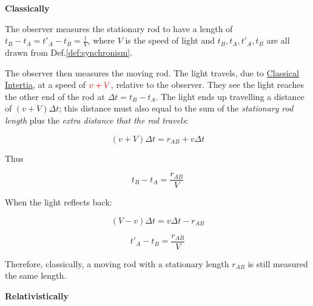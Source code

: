 \begin{tcolorbox}[
    breakable,
    parbox=false,
    skin=bicolor,
    sidebyside,
    boxrule=0pt,
    frame style={
        top color=blue!50!white
    },
    colback=red!5!white,
    colbacklower=green!5!white,
    title={Suppose the rod is moving in the x-direction at a constant speed $v$. Let the length of the moving rod, measured in the system at rest, be denoted as $r_{AB}$, where $A$ and $B$ are the two ends of the rod.}
]
    \begin{center}
        \textbf{Classically}
    \end{center}

    The observer measures the stationary rod to have a length of $t_B - t_A = t'_A - t_B = \frac{l}{V}$, where $V$ is
    the speed of light and $t_B, t_A, t'_A, t_B$ are all drawn from Def.\ref{def:synchronism}.

    The observer then measures the moving rod. The light travels, due to
    \href{https://en.wikipedia.org/wiki/Inertia}{Classical Intertia}, at a speed of $ \color{red} v + V$, relative to
    the observer. They see the light reaches the other end of the rod at $\Delta t = t_B - t_A$. The light ends up
    travelling a distance of $(v + V)\Delta t$; this distance must also equal to the sum of the \textit{stationary rod
    length} plus the \textit{extra distance that the rod travels}:

    \begin{equation}
        (v + V)\Delta t = r_{AB} + v\Delta t
    \end{equation}

    Thus

    \begin{equation}
        t_B - t_A = \frac{r_{AB}}{V}
    \end{equation}

    When the light reflects back:

    \begin{equation}
        (V - v)\Delta t = v\Delta t - r_{AB}
    \end{equation}

    \begin{equation}
        t'_A - t_B = \frac{r_{AB}}{V}
    \end{equation}

    Therefore, classically, a moving rod with a stationary length $r_{AB}$ is still measured the same length.

    \tcblower

    \begin{center}
        \textbf{Relativistically}
    \end{center}


\end{tcolorbox}
